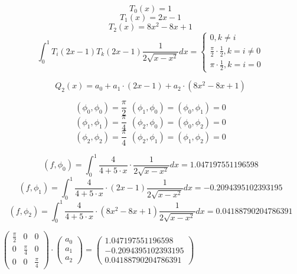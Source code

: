 \begin{displaymath}
T_0(x) = 1
\end{displaymath}
\begin{displaymath}
T_1(x) = 2x - 1
\end{displaymath}
\begin{displaymath}
T_2(x) = 8x^2 - 8x + 1
\end{displaymath}
\begin{displaymath}
\int_0^1 T_i(2x - 1) T_k(2x - 1)\frac{1}{2 \sqrt{x - x^2}} dx = \begin{cases} 0, k \neq i \\ \frac{\pi}{2} \cdot \frac{1}{2}, k = i \neq 0 \\ \pi \cdot \frac{1}{2}, k = i = 0 \end{cases}
\end{displaymath}

\begin{displaymath}
Q_2(x) = a_0 + a_1 \cdot (2x - 1) + a_2 \cdot (8x^2 - 8x + 1)
\end{displaymath}

\begin{displaymath}
(\phi_0, \phi_0) = \frac{\pi}{2} \ \ (\phi_1, \phi_0) = (\phi_0, \phi_1) = 0
\end{displaymath}
\begin{displaymath}
(\phi_1, \phi_1) = \frac{\pi}{4} \ \ (\phi_2, \phi_0) = (\phi_0, \phi_2) = 0
\end{displaymath}
\begin{displaymath}
(\phi_2, \phi_2) = \frac{\pi}{4} \ \ (\phi_2, \phi_1) = (\phi_1, \phi_2) = 0
\end{displaymath}

\begin{displaymath}
(f, \phi_0) = \int_0^1 \frac{4}{4 + 5 \cdot x} \cdot \frac{1}{2 \sqrt{x - x^2}} dx = 1.047197551196598
\end{displaymath}
\begin{displaymath}
(f, \phi_1) = \int_0^1 \frac{4}{4 + 5 \cdot x} \cdot (2x - 1) \frac{1}{2 \sqrt{x - x^2}} dx = -0.2094395102393195
\end{displaymath}
\begin{displaymath}
(f, \phi_2) = \int_0^1 \frac{4}{4 + 5 \cdot x} \cdot (8x^2 - 8x + 1) \frac{1}{2 \sqrt{x - x^2}} dx = 0.04188790204786391
\end{displaymath}

$
\begin{pmatrix}
\frac{\pi}{2} & 0 & 0
\\
0 & \frac{\pi}{4} & 0
\\
0 & 0 & \frac{\pi}{4}
\end{pmatrix}
\cdot
\begin{pmatrix}
a_0
\\
a_1
\\
a_2
\end{pmatrix}
=
\begin{pmatrix}
1.047197551196598
\\
-0.2094395102393195
\\
0.04188790204786391
\end{pmatrix}
$\\[1mm]

